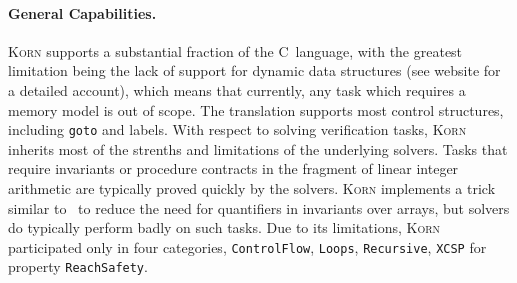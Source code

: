 \documentclass{llncs}
\newcommand{\Korn}{\textsc{Korn}\xspace}
\begin{document}
\paragraph{General Capabilities.}
\Korn supports a substantial fraction of the C~language, with the greatest limitation
being the lack of support for dynamic data structures (see website for a detailed account),
which means that currently, any task which requires a memory model is out of scope.
The translation supports most control structures, including \texttt{goto} and labels.
With respect to solving verification tasks,
\Korn inherits most of the strenths and limitations of the underlying solvers.
Tasks that require invariants or procedure contracts in the fragment of linear integer arithmetic
are typically proved quickly by the solvers.
\Korn implements a trick similar to~\cite{monniaux2016cell}
to reduce the need for quantifiers in invariants over arrays,
but solvers do typically perform badly on such tasks.
Due to its limitations, \Korn participated only in four categories,
\texttt{ControlFlow},
\texttt{Loops},
\texttt{Recursive},
\texttt{XCSP}
for property \texttt{ReachSafety}.
\end{document}
